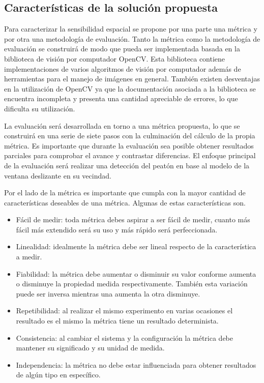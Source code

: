 \subsection{Características de la solución propuesta}

Para caracterizar la sensibilidad espacial se propone por una parte una métrica y por otra una metodología de evaluación. Tanto la métrica como la metodología de evaluación se construirá de modo que pueda ser implementada basada en la biblioteca de visión por computador OpenCV. Esta biblioteca contiene implementaciones de varios algoritmos de visión por computador además de herramientas para el manejo de imágenes en general. También existen desventajas en la utilización de OpenCV ya que la documentación asociada a la biblioteca se encuentra incompleta y presenta una cantidad apreciable de errores, lo que dificulta su utilización.

La evaluación será desarrollada en torno a una métrica propuesta, lo que se construirá en una serie de siete pasos con la culminación del cálculo de la propia métrica. Es importante que durante la evaluación sea posible obtener resultados parciales para comprobar el avance y contrastar diferencias. El enfoque principal de la evaluación será realizar una detección del peatón en base al modelo de la ventana deslizante en su vecindad. 

Por el lado de la métrica es importante que cumpla con la mayor cantidad de características deseables de una métrica. Algunas de estas características son.


\begin{itemize}
\item Fácil de medir: toda métrica debes aspirar a ser fácil de medir, cuanto más fácil más extendido será su uso y más rápido será perfeccionada.
\item Linealidad: idealmente la métrica debe ser lineal respecto de la característica a medir.
\item Fiabilidad: la métrica debe aumentar o disminuir su valor conforme aumenta o disminuye la propiedad medida respectivamente. También esta variación puede ser inversa \ie mientras una aumenta la otra disminuye.
\item Repetibilidad: al realizar el mismo experimento en varias ocasiones el resultado es el mismo \ie la métrica tiene un resultado determinista.
\item Consistencia: al cambiar el sistema y la configuración la métrica debe mantener su significado y su unidad de medida.
\item Independencia: la métrica no debe estar influenciada para obtener resultados de algún tipo en específico.
\end{itemize}

